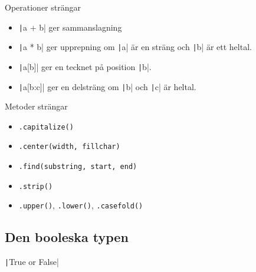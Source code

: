 \begin{frame}[fragile]
  \begin{block}{Operationer strängar}
    \begin{itemize}
      \item \texttt|a + b| ger sammanslagning
      \item \texttt|a * b| ger upprepning om \texttt|a| 
        är en sträng och \texttt|b| är ett heltal.
      \item \texttt|a[b]| ger en tecknet på position 
        \texttt|b|.
      \item \texttt|a[b:c]| ger en delsträng om 
        \texttt|b| och  \texttt|c| är heltal.
    \end{itemize}
  \end{block}

  \pause

  \begin{block}{Metoder strängar}
    \begin{itemize}
      \item \texttt{.capitalize()}
      \item \texttt{.center(width, fillchar)}
      \item \texttt{.find(substring, start, end)}
      \item \texttt{.strip()}
      \item \texttt{.upper()}, \texttt{.lower()}, \texttt{.casefold()}
    \end{itemize}
  \end{block}
\end{frame}

\subsection{Den booleska typen}

\begin{frame}
  \begin{center}
    \texttt|True or False|
  \end{center}
\end{frame}

